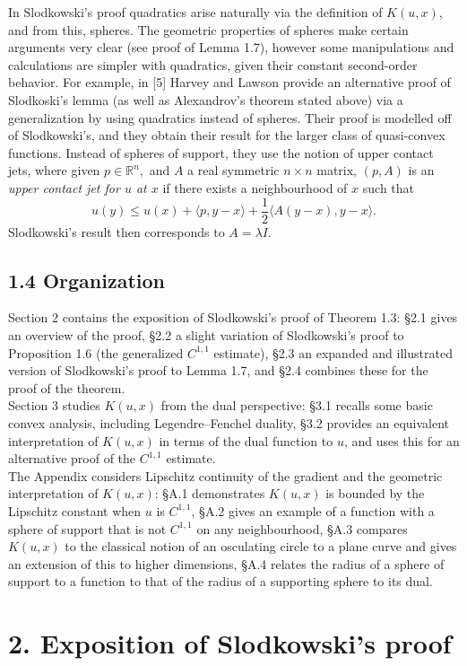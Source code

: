 \documentclass[10pt]{article}
\begin{document}
In Slodkowski's proof quadratics arise naturally via the definition of $K(u,x)$, and from this, spheres. The geometric properties of spheres make certain arguments very clear (see proof of Lemma 1.7), however some manipulations and calculations are simpler with quadratics, given their constant second-order behavior. For example, in [5] Harvey and Lawson provide an alternative proof of Slodkoski's lemma (as well as Alexandrov's theorem stated above) via a generalization by using quadratics instead of spheres. Their proof is modelled off of Slodkowski's, and they obtain their result for the larger class of quasi-convex functions. Instead of spheres of support, they use the notion of upper contact jets, where given $p\in \mathbb{R}^n,$ and $A$ a real symmetric $n\times n$ matrix, $(p,A)$ is an \textit{upper contact jet for $u$ at $x$} if there exists a neighbourhood of $x$ such that 
$$u(y)\leq u(x) +\langle p,y-x \rangle + \frac{1}{2}\langle A(y-x), y-x\rangle.$$
Slodkowski's result then corresponds to $A=\lambda I$.

\subsection{1.4 Organization}
Section 2 contains the exposition of Slodkowski's proof of Theorem 1.3: \S 2.1 gives an overview of the proof, \S 2.2 a slight variation of Slodkowski's proof to Proposition 1.6 (the generalized $C^{1,1}$ estimate), \S 2.3 an expanded and illustrated version of Slodkowski's proof to Lemma 1.7, and \S 2.4 combines these for the proof of the theorem.\\
Section 3 studies $K(u,x)$ from the dual perspective: \S 3.1 recalls some basic convex analysis, including Legendre--Fenchel duality, \S 3.2 provides an equivalent interpretation of $K(u,x)$ in terms of the dual function to $u$, and uses this for an alternative proof of the $C^{1,1}$ estimate.\\
The Appendix considers Lipschitz continuity of the gradient and the geometric interpretation of $K(u,x)$: \S A.1 demonstrates $K(u,x)$ is bounded by the Lipschitz constant when $u$ is $C^{1,1}$, \S A.2 gives an example of a function with a sphere of support that is not $C^{1,1}$ on any neighbourhood, \S A.3 compares $K(u,x)$ to the classical notion of an osculating circle to a plane curve and gives an extension of this to higher dimensions, \S A.4 relates the radius of a sphere of support to a function to that of the radius of a supporting sphere to its dual.
\section{2. Exposition of Slodkowski's proof}
\end{document}
